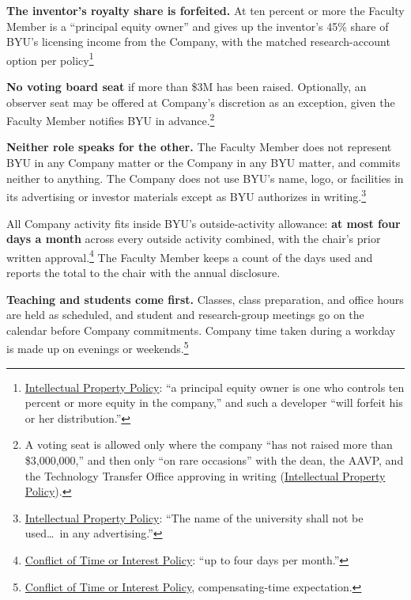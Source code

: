 \documentclass[11pt]{article}
\begin{document}
 \textbf{The inventor's royalty share is forfeited.} At ten
percent or more the Faculty Member is a ``principal equity owner'' and gives
up the inventor's 45\% share of BYU's licensing income from the Company, with
the matched research-account option per policy\footnote{\href{https://policy.byu.edu/view/intellectual-property-policy}{Intellectual
Property Policy}: ``a principal equity owner is one who controls ten percent
or more equity in the company,'' and such a developer ``will forfeit his or
her distribution.''}

 \textbf{No voting board seat} if more than \$3M has been raised. Optionally, an observer seat may be offered at Company's discretion as an exception, given the Faculty Member notifies BYU in advance.\footnote{A voting seat is allowed only where the company ``has
not raised more than \$3,000,000,'' and then only ``on rare occasions'' with
the dean, the AAVP, and the Technology Transfer Office approving in writing
(\href{https://policy.byu.edu/view/intellectual-property-policy}{Intellectual
Property Policy}).}

 \textbf{Neither role speaks for the other.} The Faculty Member
does not represent BYU in any Company matter or the Company in any BYU matter,
and commits neither to anything. The Company does not use BYU's name, logo, or
facilities in its advertising or investor materials except as BYU authorizes in
writing.\footnote{\href{https://policy.byu.edu/view/intellectual-property-policy}{Intellectual
Property Policy}: ``The name of the university shall not be used\ldots\ in any
advertising.''}



 All Company activity fits inside BYU's outside-activity
allowance: \textbf{at most four days a month} across every outside activity
combined, with the chair's prior written
approval.\footnote{\href{https://policy.byu.edu/view/conflict-of-time-or-interest-policy}{Conflict
of Time or Interest Policy}: ``up to four days per month.''} The Faculty
Member keeps a count of the days used and reports the total to the chair with
the annual disclosure.

 \textbf{Teaching and students come first.} Classes, class
preparation, and office hours are held as scheduled, and student and
research-group meetings go on the calendar before Company commitments. Company
time taken during a workday is made up on evenings or weekends.\footnote{\href{https://policy.byu.edu/view/conflict-of-time-or-interest-policy}{Conflict
of Time or Interest Policy}, compensating-time expectation.}
\end{document}
